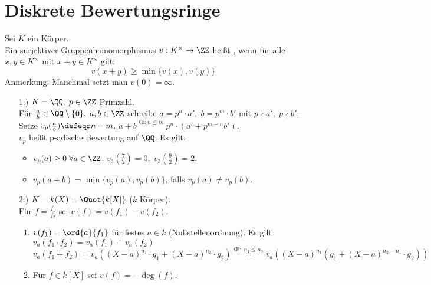 \section{Diskrete Bewertungsringe}

\begin{Def} 
Sei $K$ ein Körper.\\
Ein surjektiver Gruppenhomomorphismus $v: K^{\times} \to \ZZ$ heißt
, wenn für alle $x,y \in
K^{\times}$ mit $x + y \in K^{\times}$ gilt:
$$ v(x+y) \geq \min\{v(x),v(y)\}$$
Anmerkung: Manchmal setzt man $v(0) = \infty$.
\end{Def}

\begin{nnBsp} 
\begin{enumerate}
  \item[1.)] $K = \QQ, \; p \in \ZZ$ Primzahl.\\
  Für $\frac{a}{b} \in \QQ \setminus \{0\}, \; a,b \in \ZZ$
  schreibe $a = p^n \cdot a', \; b = p^m \cdot b'$ mit $p \nmid a',\; p \nmid
  b'$.\\
  Setze $v_p(\frac{a}{b}) \defeqr n - m$.
  $a + b \overset{\text{\OE}: n \leq m}{=} p^n \cdot (a' + p^{m-n} b')$.\\
  $v_p$ heißt p-adische Bewertung auf $\QQ$. Es gilt:
  \begin{itemize}
    \item $v_p(a) \geq 0 \; \forall a \in \ZZ$. $v_3(\frac{7}{2}) = 0, \;
    v_3(\frac{9}{2})= 2$.
    \item $v_p(a+b) = \min\{v_p(a),v_p(b)\}$, falls $v_p(a) \not= v_p(b)$.
  \end{itemize}
  \item[2.)] $K = k(X) = \Quot{k[X]}$ ($k$ Körper).\\
  Für $f = \frac{f_1}{f_2}$ sei $v(f) = v(f_1) - v(f_2)$.
  \begin{enumerate}
    \item $v(f_1) = \ord{a}{f_1}$ für festes $a \in k$
    (Nullstellenordnung).
    Es gilt $v_a(f_1 \cdot f_2) = v_a(f_1) + v_a(f_2)$
    $v_a(f_1 + f_2) = v_a((X-a)^{n_1} \cdot g_1 + (X-a)^{n_2} \cdot g_2)
    \overset{\text{\OE}: \; n_1 \leq n_2}{=} v_a((X-a)^{n_1}(g_1 + (X-a)^{n_2 - 
    n_1} \cdot g_2))$
    \item Für $f \in k[X]$ sei $v(f) = - \deg (f)$.
  \end{enumerate}
\end{enumerate}
\end{nnBsp}

